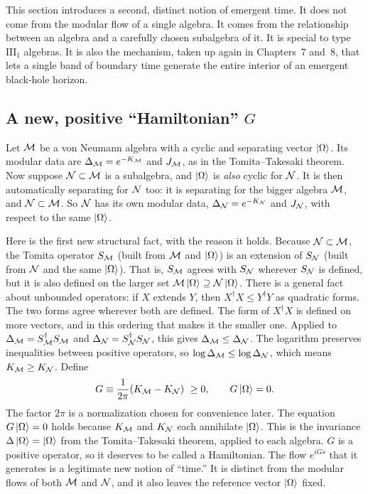 This section introduces a second, distinct notion of emergent time. It does not come from the modular flow of a
single algebra. It comes from the relationship between an algebra and a carefully chosen subalgebra of it. It
is special to type $\mathrm{III}_1$ algebras. It is also the mechanism, taken up again in Chapters~7 and~8, that
lets a single band of boundary time generate the entire interior of an emergent black-hole horizon.

\subsection*{A new, positive ``Hamiltonian'' $G$}

Let $\mathcal{M}$ be a von Neumann algebra with a cyclic and separating vector $\ket\Omega$. Its modular data are
$\Delta_{\mathcal{M}}=e^{-K_{\mathcal{M}}}$ and $J_{\mathcal{M}}$, as in the Tomita--Takesaki theorem. Now suppose $\mathcal{N}\subset\mathcal{M}$ is a
subalgebra, and $\ket\Omega$ is \emph{also} cyclic for $\mathcal{N}$. It is then automatically separating for $\mathcal{N}$ too:
it is separating for the bigger algebra $\mathcal{M}$, and $\mathcal{N}\subset\mathcal{M}$. So $\mathcal{N}$ has its own modular data,
$\Delta_{\mathcal{N}}=e^{-K_{\mathcal{N}}}$ and $J_{\mathcal{N}}$, with respect to the same $\ket\Omega$.

Here is the first new structural fact, with the reason it holds. Because $\mathcal{N}\subset\mathcal{M}$, the Tomita operator
$S_{\mathcal{M}}$ (built from $\mathcal{M}$ and $\ket\Omega$) is an extension of $S_{\mathcal{N}}$ (built from $\mathcal{N}$ and the same
$\ket\Omega$). That is, $S_{\mathcal{M}}$ agrees with $S_{\mathcal{N}}$ wherever $S_{\mathcal{N}}$ is defined, but it is also defined on the
larger set $\mathcal{M}\ket\Omega\supseteq\mathcal{N}\ket\Omega$. There is a general fact about unbounded operators: if $X$
extends $Y$, then $X^\dagger X\le Y^\dagger Y$ as quadratic forms. The two forms agree wherever both are
defined. The form of $X^\dagger X$ is defined on more vectors, and in this ordering that makes it the smaller
one. Applied to $\Delta_{\mathcal{M}}=S_{\mathcal{M}}^\dagger S_{\mathcal{M}}$ and $\Delta_{\mathcal{N}}=S_{\mathcal{N}}^\dagger S_{\mathcal{N}}$, this gives
$\Delta_{\mathcal{M}}\le\Delta_{\mathcal{N}}$. The logarithm preserves inequalities between positive operators, so
$\log\Delta_{\mathcal{M}}\le\log\Delta_{\mathcal{N}}$, which means $K_{\mathcal{M}}\ge K_{\mathcal{N}}$. Define
\begin{equation}
G \equiv \frac{1}{2\pi}(K_{\mathcal{M}}-K_{\mathcal{N}}) \ \ge 0, \qquad G\ket\Omega=0 .
\label{eq:G-def}
\end{equation}
The factor $2\pi$ is a normalization chosen for convenience later. The equation $G\ket\Omega=0$ holds because
$K_{\mathcal{M}}$ and $K_{\mathcal{N}}$ each annihilate $\ket\Omega$. This is the invariance $\Delta\ket\Omega=\ket\Omega$ from the
Tomita--Takesaki theorem, applied to each algebra. $G$ is a positive operator, so it deserves to be called a
Hamiltonian. The flow $e^{iGs}$ that it generates is a legitimate new notion of ``time.'' It is distinct from
the modular flows of both $\mathcal{M}$ and $\mathcal{N}$, and it also leaves the reference vector $\ket\Omega$ fixed.

